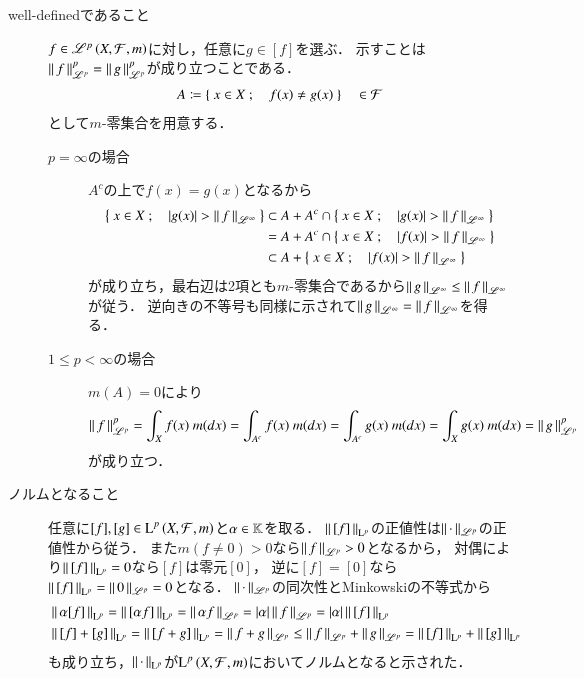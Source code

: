 \begin{prf}\mbox{}
	\begin{description}
		\item[well-definedであること]
			$f \in \mathscr{L}^{p} \left(X,\mathcal{F},m\right)$に対し，任意に$g \in [f]$を選ぶ．
			示すことは$\left\|\, f\, \right\|_{\mathscr{L}^p}^p = \left\|\, g\, \right\|_{\mathscr{L}^p}^p$が成り立つことである．
			\begin{align}
				A \coloneqq \left\{\ x \in X\ ;\quad f(x) \neq g(x)\ \right\} \quad \in \mathcal{F}
			\end{align}
			として$m$-零集合を用意する．
			\begin{description}
				\item[$p = \infty$の場合]
					$A^c$の上で$f(x)=g(x)$となるから
					\begin{align}
						\left\{\ x \in X\ ;\quad |g(x)| > \left\|\, f\, \right\|_{\mathscr{L}^\infty}\ \right\} 
						&\subset A + A^c \cap \left\{\ x \in X\ ;\quad |g(x)| > \left\|\, f\, \right\|_{\mathscr{L}^\infty}\ \right\} \\
						&= A + A^c \cap \left\{\ x \in X\ ;\quad |f(x)| > \left\|\, f\, \right\|_{\mathscr{L}^\infty}\ \right\} \\
						&\subset A + \left\{\ x \in X\ ;\quad |f(x)| > \left\|\, f\, \right\|_{\mathscr{L}^\infty}\ \right\}
					\end{align}
					が成り立ち，最右辺は2項とも$m$-零集合であるから$\left\|\, g\, \right\|_{\mathscr{L}^\infty} \leq \left\|\, f\, \right\|_{\mathscr{L}^\infty}$が従う．
					逆向きの不等号も同様に示されて$\left\|\, g\, \right\|_{\mathscr{L}^\infty} = \left\|\, f\, \right\|_{\mathscr{L}^\infty}$を得る．
				\item[$1 \leq p < \infty$の場合]
					$m(A)=0$により
					\begin{align}
						\left\|\, f\, \right\|_{\mathscr{L}^p}^p = \int_X f(x)\ m(dx) = \int_{A^c} f(x)\ m(dx) = \int_{A^c} g(x)\ m(dx) = \int_X g(x)\ m(dx) = \left\|\, g\, \right\|_{\mathscr{L}^p}^p
					\end{align}
					が成り立つ．
			\end{description}
		
		\item[ノルムとなること]
			任意に$[f],[g] \in \operatorname{L}^{p} \left(X,\mathcal{F},m\right)$と$\alpha \in \mathbb{K}$を取る．
			$\left\|\, [f]\, \right\|_{\mathrm{L}^p}$の正値性は$\left\|\, \cdot\, \right\|_{\mathscr{L}^p}$の正値性から従う．
			また$m(f \neq 0) > 0$なら$\left\|\, f\, \right\|_{\mathscr{L}^p} > 0$となるから，
			対偶により$\left\|\, [f]\, \right\|_{\mathrm{L}^p} = 0$なら$[f]$は零元$[0]$，
			逆に$[f] = [0]$なら$\left\|\, [f]\, \right\|_{\mathrm{L}^p} = \left\|\, 0\, \right\|_{\mathscr{L}^p} = 0$となる．
			$\left\|\, \cdot\, \right\|_{\mathscr{L}^p}$の同次性とMinkowskiの不等式から
			\begin{align}
				&\left\|\, \alpha[f]\, \right\|_{\mathrm{L}^p} = \left\|\, [\alpha f]\, \right\|_{\mathrm{L}^p} = \left\|\, \alpha f\, \right\|_{\mathscr{L}^p} = |\alpha|\left\|\, f\, \right\|_{\mathscr{L}^p} = |\alpha|\left\|\, [f]\, \right\|_{\mathrm{L}^p} \\
				&\left\|\, [f] + [g]\, \right\|_{\mathrm{L}^p} = \left\|\, [f + g]\, \right\|_{\mathrm{L}^p} = \left\|\, f + g\, \right\|_{\mathscr{L}^p} \leq \left\|\, f\, \right\|_{\mathscr{L}^p} + \left\|\, g\, \right\|_{\mathscr{L}^p} = \left\|\, [f]\, \right\|_{\mathrm{L}^p} + \left\|\, [g]\, \right\|_{\mathrm{L}^p}
			\end{align}
			も成り立ち，$\left\|\, \cdot\, \right\|_{\mathrm{L}^p}$が$\operatorname{L}^{p} \left(X,\mathcal{F},m\right)$においてノルムとなると示された．
	\end{description}
	\QED
\end{prf}

